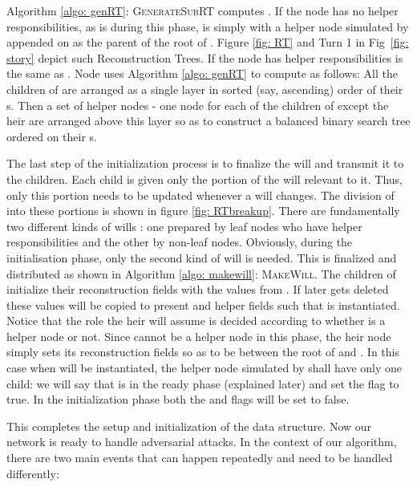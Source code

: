 \documentclass[11pt]{article}
\begin{document}
Algorithm \ref{algo: genRT}: \textsc{GenerateSubRT} computes
. If the node  has no helper responsibilities, as is
during this phase,  is simply  with a helper node
simulated by  appended on as the parent of the root of
. Figure \ref{fig: RT} and Turn 1 in Fig~\ref{fig: story}
depict such Reconstruction Trees. If the node  has helper
responsibilities  is the same as . Node  uses
Algorithm \ref{algo: genRT} to compute  as follows: All the
children of  are arranged as a single layer in sorted (say,
ascending) order of their s. Then a set of helper nodes - one
node for each of the children of  except the heir are arranged
above this layer so as to construct a balanced binary search tree
ordered on their s.

 The last step of the initialization process is to finalize the will and transmit it to the children. Each child is
given only the portion of the will relevant to it. Thus, only this portion needs to be updated whenever a will changes.
The division of  into these portions is shown in figure \ref{fig: RTbreakup}.  There are fundamentally two
different kinds of wills : one prepared by leaf nodes who have helper responsibilities and the other by non-leaf nodes.
Obviously, during the initialisation phase, only the second kind of will is needed. This is finalized and distributed as
shown in Algorithm \ref{algo: makewill}: \textsc{MakeWill}. 
The children of  initialize their reconstruction fields
with the values from . If later  gets deleted these values will be copied to present and helper fields
such that  is instantiated. Notice that the role the heir will assume is decided according to whether  is a
helper node or not. Since  cannot be a helper node in this phase, the heir node simply sets its reconstruction
fields so as to be between the root of  and . In this case when  will be instantiated,
the helper node simulated by  shall have only one child: we will say that  is in the ready phase
(explained later) and set the flag  to true. In the initialization phase both the  and 
 flags will be set to false. 










This completes the setup and initialization of the data structure. Now our network is ready to handle adversarial
attacks. In the context of our algorithm, there are two main events that can happen repeatedly and  need to be handled
differently:
\end{document}

